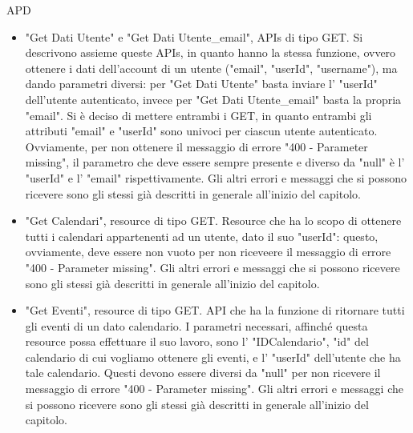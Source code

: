 \begin{listaPersonale} {APD}
\begin{listaPersonale2}[APD]{}
\begin{listaPersonale3}[APD]{}
\begin{itemize}
                \item "Get Dati Utente" e "Get Dati Utente\_email", APIs di tipo GET. Si descrivono assieme queste APIs, in quanto hanno la stessa funzione, ovvero ottenere i dati dell'account di un utente ("email", "userId", "username"), ma dando parametri diversi: per "Get Dati Utente" basta inviare l' "userId" dell'utente autenticato, invece per "Get Dati Utente\_email" basta la propria "email". Si è deciso di mettere entrambi i GET, in quanto entrambi gli attributi "email" e "userId" sono univoci per ciascun utente autenticato. Ovviamente, per non ottenere il messaggio di errore "400 - Parameter missing", il parametro che deve essere sempre presente e diverso da "null" è l' "userId" e l' "email" rispettivamente. Gli altri errori e messaggi che si possono ricevere sono gli stessi già descritti in generale all'inizio del capitolo.
                \item "Get Calendari", resource di tipo GET. Resource che ha lo scopo di ottenere tutti i calendari appartenenti ad un utente, dato il suo "userId": questo, ovviamente, deve essere non vuoto per non riceveere il messaggio di errore "400 - Parameter missing". Gli altri errori e messaggi che si possono ricevere sono gli stessi già descritti in generale all'inizio del capitolo.
                \item "Get Eventi", resource di tipo GET. API che ha la funzione di ritornare tutti gli eventi di un dato calendario. I parametri necessari, affinché questa resource possa effettuare il suo lavoro, sono l' "IDCalendario", "id" del calendario di cui vogliamo ottenere gli eventi, e l' "userId" dell'utente che ha tale calendario. Questi devono essere diversi da "null" per non ricevere il messaggio di errore "400 - Parameter missing". Gli altri errori e messaggi che si possono ricevere sono gli stessi già descritti in generale all'inizio del capitolo.
            \end{itemize}
            \begin{center}
                

\end{center}
\end{listaPersonale3}
\end{listaPersonale2}
\end{listaPersonale}
